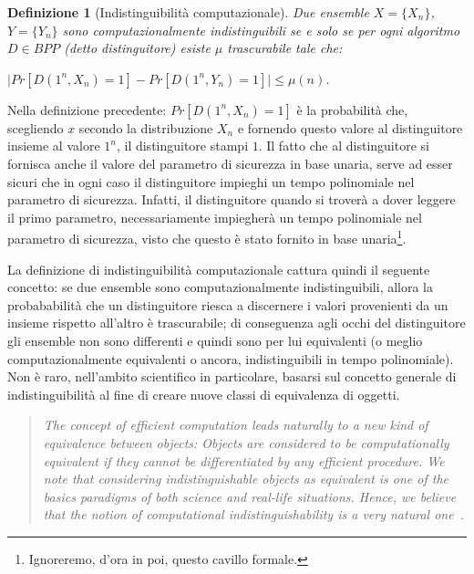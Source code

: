 \documentclass[a4paper,openright,twoside,12pt]{report}
\newtheorem{definizione}{Definizione}[chapter]
\begin{document}
\begin{definizione}[Indistinguibilit\`a computazionale]
Due ensemble $X=\{X_n\}$, $Y=\{Y_n\}$ sono computazionalmente indistinguibili se e solo se per ogni algoritmo $D \in BPP$ (detto distinguitore) esiste $\mu$ trascurabile tale che:
\begin{center}$\lvert Pr[D(1^n, X_n) = 1] - Pr[D(1^n, Y_n) = 1] \rvert \leq \mu(n)$.\end{center}
\end{definizione}
Nella definizione precedente: $Pr[D(1^n, X_n) = 1]$ \`e la probabilit\`a che, scegliendo $x$ secondo la distribuzione $X_n$ e fornendo questo valore al distinguitore insieme al valore $1^n$, il distinguitore stampi $1$.
Il fatto che al distinguitore si fornisca anche il valore del parametro di sicurezza in base unaria, serve ad esser sicuri che in ogni caso il distinguitore impieghi un tempo polinomiale 
nel parametro di sicurezza.
Infatti, il distinguitore quando si trover\`a a dover leggere il primo parametro, necessariamente impiegher\`a un tempo polinomiale nel parametro di sicurezza, visto che questo \`e stato 
fornito in base unaria\footnote{Ignoreremo, d'ora in poi, questo cavillo formale.}.

La definizione di indistinguibilit\`a computazionale cattura quindi il seguente concetto: se due ensemble sono computazionalmente indistinguibili, 
allora la probababilit\`a che un distinguitore riesca a discernere i valori provenienti da un insieme rispetto all'altro \`e trascurabile; di conseguenza agli occhi del distinguitore 
gli ensemble non sono differenti e quindi sono per lui equivalenti (o meglio computazionalmente equivalenti o ancora, indistinguibili in tempo polinomiale). 
Non \`e raro, nell'ambito scientifico in particolare, basarsi sul concetto generale di indistinguibilit\`a al fine di creare nuove classi di equivalenza di oggetti.
\begin{quotation}
\emph{The concept of efficient computation leads naturally to a new kind of equivalence between objects: Objects are considered to be computationally equivalent if they cannot be
differentiated by any efficient procedure. We note that considering indistinguishable objects as equivalent is one of the basics paradigms of both science and real-life situations. Hence,
we believe that the notion of computational indistinguishability is a very natural one~\cite{519078}.}
\end{quotation}
\end{document}
